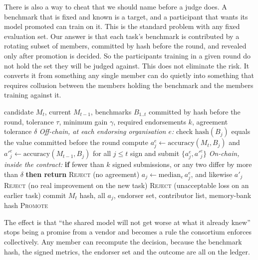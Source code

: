 \documentclass[11pt,a4paper]{article}
\begin{document}
There is also a way to cheat that we should name before a judge does. A
benchmark that is fixed and known is a target, and a participant that wants its
model promoted can train on it. This is the standard problem with any fixed
evaluation set. Our answer is that each task's benchmark is contributed by a
rotating subset of members, committed by hash before the round, and revealed only
after promotion is decided. So the participants training in a given round do not
hold the set they will be judged against. This does not eliminate the risk. It converts it from something any single member can do quietly into
something that requires collusion between the members holding the benchmark and
the members training against it.

\begin{algorithm}[htbp]
\caption{Continuity Gate. Accuracies are computed off-chain by each endorsing
organisation and signed; the contract checks the signed values.}
\label{alg:gate}
\begin{algorithmic}[1]
\Require candidate $M_{t}$, current $M_{t-1}$, benchmarks $B_{1..t}$ committed
  by hash before the round, tolerance $\tau$, minimum gain $\gamma$, required
  endorsements $k$, agreement tolerance $\delta$
\Statex \textit{Off-chain, at each endorsing organisation $e$:}
\State check $\mathrm{hash}(B_{j})$ equals the value committed before the round
\State compute $a^{e}_{j} \gets \mathrm{accuracy}(M_{t}, B_{j})$ and
       $a'^{e}_{j} \gets \mathrm{accuracy}(M_{t-1}, B_{j})$ for all $j \le t$
\State sign and submit $\{a^{e}_{j}, a'^{e}_{j}\}$
\Statex \textit{On-chain, inside the contract:}
\State \textbf{if} fewer than $k$ signed submissions, or any two differ by more
       than $\delta$ \textbf{then return} \textsc{Reject} (no agreement)
\State $a_{j} \gets \mathrm{median}_{e}\, a^{e}_{j}$, and likewise $a'_{j}$
  \State \Return \textsc{Reject} (no real improvement on the new task)
\EndIf
{}
    \State \Return \textsc{Reject} (unacceptable loss on an earlier task)
  \EndIf
\EndFor
\State commit $M_{t}$ hash, all $a_{j}$, endorser set, contributor list,
       memory-bank hash
\State \Return \textsc{Promote}
\end{algorithmic}
\end{algorithm}

The effect is that ``the shared model will not get worse at what it already
knew'' stops being a promise from a vendor and becomes a rule the consortium
enforces collectively. Any member can recompute the decision, because the
benchmark hash, the signed metrics, the endorser set and the outcome are all on
the ledger.
\end{document}
